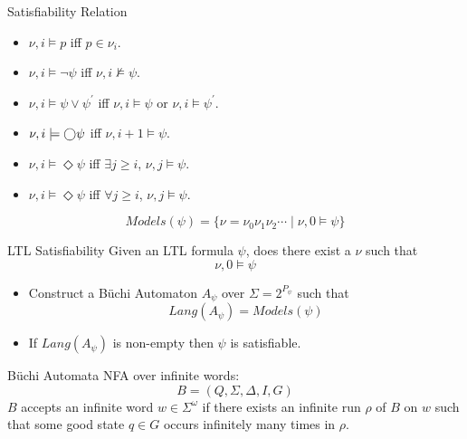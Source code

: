 \documentclass[xcolor=dvipsnames]{beamer}
\begin{document}
\begin{frame}{Satisfiability Relation}
\begin{itemize}
\item $\nu,i\models p$ iff $p \in \nu_i$.
\item $\nu,i\models \lnot \psi$ iff $\nu,i\not\models \psi$.
\item $\nu,i\models \psi\lor\psi^{\prime}$ iff $\nu,i\models \psi$ or $\nu,i\models \psi^{\prime}$.
\item $\nu,i\models \mbox{$\bigcirc$}\psi$ iff $\nu,i+1\models \psi$.
\item $\nu,i\models \Diamond \psi$ iff $\exists j\ge i$, $\nu,j\models \psi$.
\item $\nu,i\models \Diamond \psi$ iff $\forall j\ge i$, $\nu,j\models \psi$.
\end{itemize} 
\[Models(\psi)=\{\nu=\nu_0\nu_1\nu_2\cdots \mid \nu,0\models \psi\}\]
\end{frame}



\begin{frame}{LTL Satisfiability}
Given an LTL formula $\psi$, does there exist a $\nu$ such that \[\nu,0 \models \psi\]
\begin{itemize}
\item Construct a B\"uchi Automaton $A_{\psi}$ over $\Sigma=2^{P_{\psi}}$ such that \[Lang(A_{\psi})=Models(\psi)\]
\item If $Lang(A_{\psi})$ is non-empty then $\psi$ is satisfiable.
\end{itemize}

\end{frame}

\begin{frame}{B\"uchi Automata}
NFA over infinite words:
\[B=(Q,\Sigma,\Delta,I,G)\]
$B$ accepts an infinite word $w \in \Sigma^{\omega}$ if there exists an infinite run $\rho$ of $B$ on $w$ such that some good state $q \in G$ occurs infinitely many times in $\rho$.
%
\newline
\begin{figure}
\begin{center}

\end{center}
\end{figure}

\end{frame}
\end{document}
